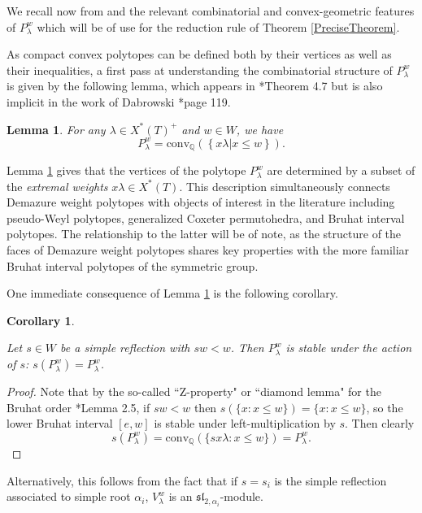 \documentclass[12pt,reqno]{amsart}
\newtheorem{corollary}[theorem]{Corollary}
\newtheorem{lemma}[theorem]{Lemma}
\theoremstyle{definition}
\begin{document}
We recall now from \cite{BJK2} and \cite{BJK3} the relevant combinatorial and convex-geometric features of $P_\lambda^w$ which will be of use for the reduction rule of Theorem \ref{PreciseTheorem}.

As compact convex polytopes can be defined both by their vertices as well as their inequalities, a first pass at understanding the combinatorial structure of $P_\lambda^w$ is given by the following lemma, which appears in \cite{BJK2}*{Theorem 4.7} but is also implicit in the work of Dabrowski \cite{Dab}*{page 119}. 

\begin{lemma} \label{Vertices}
For any $\lambda \in X^\ast(T)^+$ and $w \in W$, we have 
$$
P_\lambda^w = \mathrm{conv}_\mathbb{Q} \left(\left \{x \lambda | x \leq w \right \} \right).
$$
\end{lemma}

Lemma \ref{Vertices} gives that the vertices of the polytope $P_\lambda^w$ are determined by a subset of the \textit{extremal weights} $x\lambda \in X^\ast(T)$. This description simultaneously connects Demazure weight polytopes with objects of interest in the literature including pseudo-Weyl polytopes, generalized Coxeter permutohedra, and Bruhat interval polytopes. The relationship to the latter will be of note, as the structure of the faces of Demazure weight polytopes shares key properties with the more familiar Bruhat interval polytopes of the symmetric group. 

One immediate consequence of Lemma \ref{Vertices} is the following corollary.

\begin{corollary} \label{StablePolytope}

Let $s \in W$ be a simple reflection with $sw < w$. Then $P_\lambda^w$ is stable under the action of $s$: $s(P_\lambda^w)=P_\lambda^w$.

\end{corollary}

\begin{proof}
Note that by the so-called ``Z-property" or ``diamond lemma" for the Bruhat order \cite{BGG}*{Lemma 2.5}, if $sw < w$ then $s\left( \{x: x \leq w\} \right) = \{x : x \leq w\}$, so the lower Bruhat interval $[e,w]$ is stable under left-multiplication by $s$. Then clearly 
$$
s(P_\lambda^w) = \mathrm{conv}_\mathbb{Q}\left(\{sx\lambda : x \leq w\} \right) = P_\lambda^w.
$$
\end{proof}
\noindent Alternatively, this follows from the fact that if $s=s_i$ is the simple reflection associated to simple root $\alpha_i$, $V_\lambda^w$ is an $\mathfrak{sl}_{2, \alpha_i}$-module.
\end{document}

